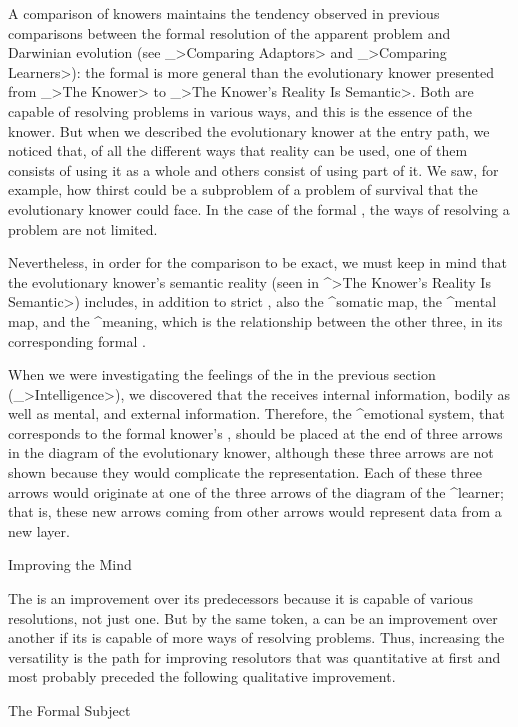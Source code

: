 A comparison of knowers maintains the tendency observed in previous
comparisons between the formal resolution of the apparent problem and
Darwinian evolution (see _>Comparing Adaptors> and _>Comparing
Learners>): the formal {\knower} is more general than the evolutionary
knower presented from _>The Knower> to _>The Knower's Reality Is
Semantic>. Both are capable of resolving problems in various ways, and
this is the essence of the knower. But when we described the
evolutionary knower at the entry path, we noticed that, of all the
different ways that reality can be used, one of them consists of using
it as a whole and others consist of using part of it. We saw, for
example, how thirst could be a subproblem of a problem of survival that
the evolutionary knower could face. In the case of the formal {\knower},
the ways of resolving a problem are not limited.

Nevertheless, in order for the comparison to be exact, we must keep in
mind that the evolutionary knower's semantic reality (seen in ^>The
Knower's Reality Is Semantic>) includes, in addition to strict
{\reality}, also the ^{somatic map}, the ^{mental map}, and the
^{meaning}, which is the relationship between the other three, in its
corresponding formal {\knower}.

When we were investigating the feelings of the {\knower} in the previous
section (_>Intelligence>), we discovered that the {\intelligence}
receives internal information, bodily as well as mental, and external
information. Therefore, the ^{emotional system}, that corresponds to the
formal {knower's} {\intelligence}, should be placed at the end of three
arrows in the diagram of the evolutionary knower, although these three
arrows are not shown because they would complicate the representation.
Each of these three arrows would originate at one of the three arrows of
the diagram of the ^{learner}; that is, these new arrows coming from
other arrows would represent data from a new layer.


\Section Improving the Mind

The {\knower} is an improvement over its predecessors because it is
capable of various resolutions, not just one. But by the same token, a
{\knower} can be an improvement over another if its {\mind} is capable
of more ways of resolving problems. Thus, increasing the {\minds}
versatility is the path for improving resolutors that was quantitative
at first and most probably preceded the following qualitative
improvement.


\Section The Formal Subject

